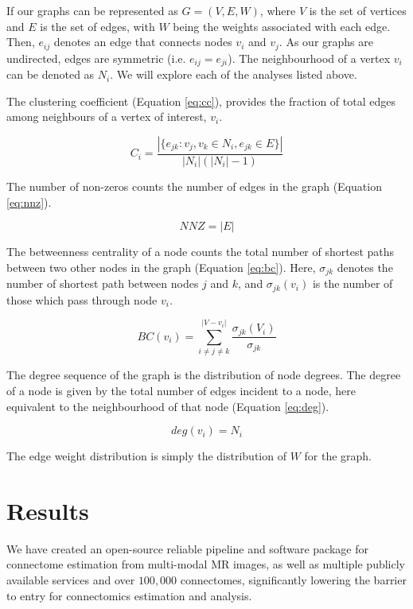 If our graphs can be represented as $G = (V,E,W)$, where $V$ is the set of vertices and $E$ is the set of edges, with $W$ being the weights associated with each edge. Then, $e_{ij}$ denotes an edge that connects nodes $v_i$ and $v_j$. As our graphs are undirected, edges are symmetric (i.e. $e_{ij} = e_{ji}$). The neighbourhood of a vertex $v_i$ can be denoted as $N_i$. We will explore each of the analyses listed above.

The clustering coefficient (Equation \ref{eq:cc}), provides the fraction of total edges among neighbours of a vertex of interest, $v_i$.

\begin{equation}
C_i = \frac{|\{  e_{jk} : v_j, v_k \in N_i, e_{jk} \in E \}|}{|N_i|(|N_i|-1)}
\label{eq:cc}
\end{equation}

The number of non-zeros counts the number of edges in the graph (Equation \ref{eq:nnz}).

\begin{equation}
NNZ = |E|
\label{eq:nnz}
\end{equation}

The betweenness centrality of a node counts the total number of shortest paths between two other nodes in the graph (Equation \ref{eq:bc}). Here, $\sigma_{jk}$ denotes the number of shortest path between nodes $j$ and $k$, and $\sigma_{jk}(v_i)$ is the number of those which pass through node $v_i$.

\begin{equation}
BC(v_i) = \sum_{i \neq j \neq k}^{|V - v_i|} \frac{\sigma_{jk}(V_i)}{\sigma_{jk}}
\label{eq:bc}
\end{equation}

The degree sequence of the graph is the distribution of node degrees. The degree of a node is given by the total number of edges incident to a node, here equivalent to the neighbourhood of that node (Equation \ref{eq:deg}).

\begin{equation}
deg(v_i) = N_i
\label{eq:deg}
\end{equation}

The edge weight distribution is simply the distribution of $W$ for the graph.


\chapter{Results}
\label{sec:results}
We have created an open-source reliable pipeline and software package for connectome estimation from multi-modal MR images, as well as multiple publicly available services and over $100,000$ connectomes, significantly lowering the barrier to entry for connectomics estimation and analysis.

